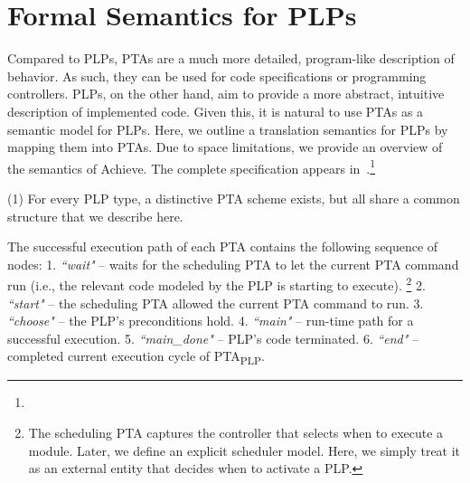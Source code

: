 \documentclass[letterpaper]{article}
\begin{document}
\section{Formal Semantics for PLPs}
Compared to PLPs, PTAs are a much more detailed, program-like description of behavior.
As such, they can be used for code specifications or programming controllers. PLPs, on the other hand,
aim to provide a more abstract, intuitive description of implemented code.
Given this, it is natural to use PTAs as a semantic model for PLPs. Here, we outline a translation
semantics for PLPs by mapping them into PTAs.
Due to space limitations, we provide an overview of the
semantics of Achieve. The complete specification appears in~\citet{kovalchu2018}.\footnote{}



(1) For every PLP type, a distinctive PTA scheme exists, but all
share a common structure that we describe here.
\par The successful execution path of each PTA contains the following sequence of nodes: 1. \textit{``wait"} -- waits for the scheduling PTA to let the current PTA command run (i.e., the relevant code modeled by the PLP is starting to execute).%
\footnote{The scheduling PTA captures the controller that selects when to execute a module. Later, we define an explicit scheduler model.
Here, we simply treat it as an external entity that decides when to activate a PLP.}
2. \textit{``start"} -- the scheduling PTA allowed the current PTA command to run. 3. \textit{``choose"} -- the PLP's preconditions hold. 4. \textit{``main"} -- run-time path for a successful execution. 5. \textit{``main\_done"} -- PLP's code terminated. 6. \textit{``end"} -- completed current execution cycle of PTA\textsubscript{PLP}.
\end{document}
